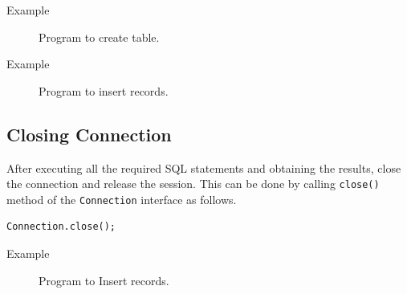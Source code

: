 \documentclass[11pt,a4paper]{article}
\begin{document}
\begin{description}
\item[Example] Program to create table.

\end{description}
\begin{description}
\item[Example] Program to insert records.

\end{description}

\subsection*{Closing Connection}
After executing all the required SQL statements and obtaining the results, close the connection and release the session. This can be done by calling \texttt{close()} method of the \texttt{Connection} interface as follows.
\begin{lstlisting}[numbers=none]
Connection.close();
\end{lstlisting}
\begin{description}
\item[Example] Program to Insert records.

\end{description}
\vfill{\ }
\end{document}
